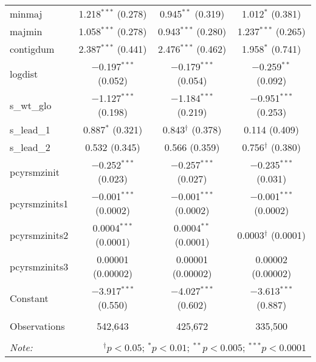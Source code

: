 \begin{table}[!htbp]
\begin{tabular}{@{\extracolsep{5pt}}lccc}
  minmaj & 1.218$^{***}$ (0.278) & 0.945$^{**}$ (0.319) & 1.012$^{*}$ (0.381) \\ 
  majmin & 1.058$^{***}$ (0.278) & 0.943$^{***}$ (0.280) & 1.237$^{***}$ (0.265) \\ 
  contigdum & 2.387$^{***}$ (0.441) & 2.476$^{***}$ (0.462) & 1.958$^{*}$ (0.741) \\ 
  logdist & $-$0.197$^{***}$ (0.052) & $-$0.179$^{***}$ (0.054) & $-$0.259$^{**}$ (0.092) \\ 
  s\_wt\_glo & $-$1.127$^{***}$ (0.198) & $-$1.184$^{***}$ (0.219) & $-$0.951$^{***}$ (0.253) \\ 
  s\_lead\_1 & 0.887$^{*}$ (0.321) & 0.843$^{\dagger}$ (0.378) & 0.114 (0.409) \\ 
  s\_lead\_2 & 0.532 (0.345) & 0.566 (0.359) & 0.756$^{\dagger}$ (0.380) \\ 
  pcyrsmzinit & $-$0.252$^{***}$ (0.023) & $-$0.257$^{***}$ (0.027) & $-$0.235$^{***}$ (0.031) \\ 
  pcyrsmzinits1 & $-$0.001$^{***}$ (0.0002) & $-$0.001$^{***}$ (0.0002) & $-$0.001$^{***}$ (0.0002) \\ 
  pcyrsmzinits2 & 0.0004$^{***}$ (0.0001) & 0.0004$^{**}$ (0.0001) & 0.0003$^{\dagger}$ (0.0001) \\ 
  pcyrsmzinits3 & 0.00001 (0.00002) & 0.00001 (0.00002) & 0.00002 (0.00002) \\ 
  Constant & $-$3.917$^{***}$ (0.550) & $-$4.027$^{***}$ (0.602) & $-$3.613$^{***}$ (0.887) \\ 
 \hline \\[-1.8ex] 
Observations & 542,643 & 425,672 & 335,500 \\ 
\hline 
\hline \\[-1.8ex] 
\textit{Note:}  & \multicolumn{3}{r}{$^{\dagger} p<0.05$; $^{*} p<0.01$; $^{**} p<0.005$; $^{***} p<0.0001$} \\ 
\end{tabular} 
\end{table} 
